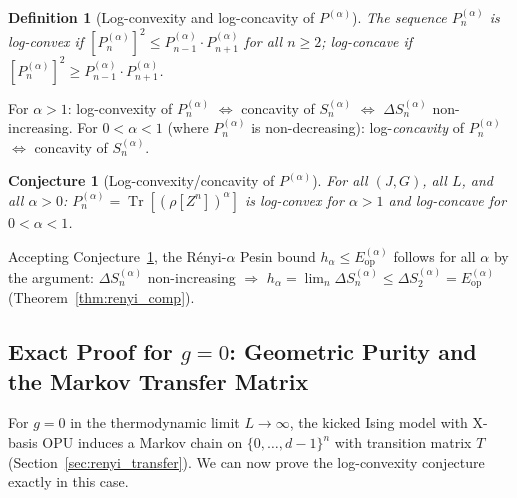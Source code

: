 \documentclass[12pt,a4paper]{article}
\newtheorem{definition}[theorem]{Definition}
\newtheorem{conjecture}[theorem]{Conjecture}
\begin{document}
\begin{definition}[Log-convexity and log-concavity of $P^{(\alpha)}$]
\label{def:logcvx}
The sequence $P_n^{(\alpha)}$ is \emph{log-convex} if $[P_n^{(\alpha)}]^2\leq P_{n-1}^{(\alpha)}\cdot P_{n+1}^{(\alpha)}$ for all $n\geq 2$;
\emph{log-concave} if $[P_n^{(\alpha)}]^2\geq P_{n-1}^{(\alpha)}\cdot P_{n+1}^{(\alpha)}$.
\end{definition}

For $\alpha>1$: log-convexity of $P^{(\alpha)}_n$ $\Leftrightarrow$ concavity of $S^{(\alpha)}_n$ $\Leftrightarrow$ $\Delta S^{(\alpha)}_n$ non-increasing.
For $0<\alpha<1$ (where $P^{(\alpha)}_n$ is non-decreasing): log-\emph{concavity} of $P^{(\alpha)}_n$ $\Leftrightarrow$ concavity of $S^{(\alpha)}_n$.

\begin{conjecture}[Log-convexity/concavity of $P^{(\alpha)}$]
\label{conj:logconv}
For all $(J,G)$, all $L$, and all $\alpha>0$:
$P_n^{(\alpha)}=\operatorname{Tr}[(\rho[Z^n])^\alpha]$ is log-convex for $\alpha>1$
and log-concave for $0<\alpha<1$.
\end{conjecture}

Accepting Conjecture~\ref{conj:logconv}, the Rényi-$\alpha$ Pesin bound $h_\alpha\leq E_{\mathrm{op}}^{(\alpha)}$
follows for all $\alpha$ by the argument: $\Delta S^{(\alpha)}_n$ non-increasing $\Rightarrow$ $h_\alpha=\lim_n\Delta S^{(\alpha)}_n\leq\Delta S^{(\alpha)}_2=E_{\mathrm{op}}^{(\alpha)}$ (Theorem~\ref{thm:renyi_comp}).

\subsection{Exact Proof for $g=0$: Geometric Purity and the Markov Transfer Matrix}
\label{subsec:markov_exact}

For $g=0$ in the thermodynamic limit $L\to\infty$, the kicked Ising model with X-basis OPU
induces a Markov chain on $\{0,\ldots,d-1\}^n$ with transition matrix $T$ (Section~\ref{sec:renyi_transfer}).
We can now prove the log-convexity conjecture exactly in this case.
\end{document}
